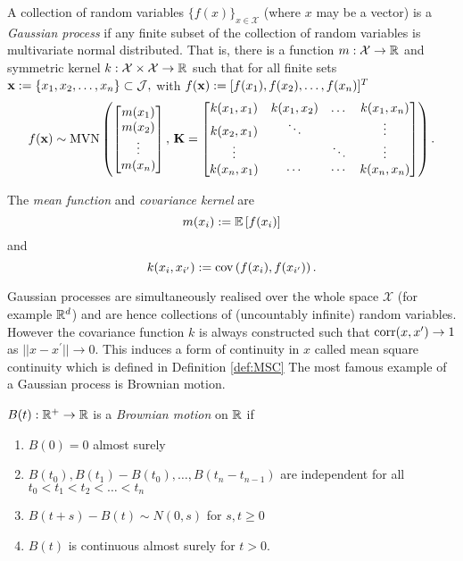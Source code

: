 \begin{definition}\label{def:gp}
    A collection of random variables $\{f(x)\}_{x\in\mathcal{X}}$
    (where $x$ may be a vector) is a \emph{Gaussian process} if any finite
    subset of the collection of random variables is multivariate normal
    distributed. That is, there is a function $m:\mathcal{X}\to\mathbb{R}$ and
    symmetric kernel $k:\mathcal{X}\times\mathcal{X}\to \mathbb{R}$ such that for all
    finite sets
    $\mathbf{x} :=\{x_1, x_2, \dots, x_n\} \subset \mathcal{J},$ with
    $f(\mathbf{x}) := [f(x_1), f(x_2), \dots, f(x_n)]^T$
    $$f(\mathbf{x}) \sim
        \operatorname{MVN}\left(\begin{bmatrix}
            m(x_1) \\ m(x_2)\\ \vdots\\ m(x_n)
        \end{bmatrix},\, \mathbf{K} = \begin{bmatrix}
            k(x_1, x_1) & k(x_1, x_2) & \dots  & k(x_1, x_n) \\
            k(x_2, x_1) & \ddots      &        & \vdots      \\
            \vdots      &             & \ddots & \vdots      \\
            k(x_n, x_1) & \cdots      & \cdots & k(x_n, x_n)
        \end{bmatrix}\right).$$
\end{definition}

\begin{definition}\label{def:mean_kernel}
    The \emph{mean function} and \emph{covariance kernel} are
    $$m(x_i) := \operatorname{\mathbb{E}}\left[f(x_i)\right]$$ and
    $$k(x_{i}, x_{i^\prime}) := \operatorname{cov}\left(f(x_i), f(x_{i^\prime})\right).$$
\end{definition}

Gaussian processes are simultaneously realised over the whole space
$\mathcal{X}$ (for example $\mathbb{R}^d$) and are hence collections of
(uncountably infinite)
random variables. However the covariance function $k$ is always constructed 
such that
$\operatorname{corr}(x, x^\prime) \to 1$ as $||x - x^\prime||\to 0.$
This induces a form of continuity in $x$ called mean square continuity which
is defined in Definition \ref{def:MSC}
The most famous example of a Gaussian process is Brownian motion.

\begin{definition}
    $B(t):\mathbb{R}^+ \to \mathbb{R}$ is a \emph{Brownian motion} on $\mathbb{R}$ if\begin{enumerate}
        \item $B(0) = 0$ almost surely
        \item $B(t_0), B(t_1) - B(t_0), \dots, B(t_n - t_{n-1})$ are
              independent for all $t_0<t_1<t_2<\dots<t_n$
        \item $B(t + s) - B(t)\sim N(0, s)$ for $s, t \geq 0$
        \item $B(t)$ is continuous almost surely for $t>0.$
    \end{enumerate}
\end{definition}

